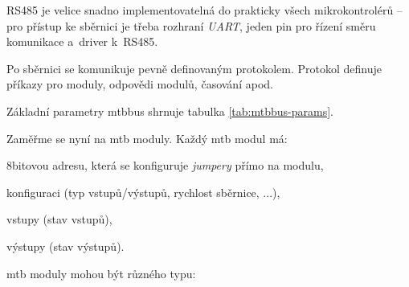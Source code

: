RS485 je velice snadno implementovatelná do prakticky všech mikrokontrolérů –
pro přístup ke sběrnici je třeba rozhraní \textit{UART}, jeden pin pro řízení směru
komunikace a~driver k~RS485.

Po sběrnici se komunikuje pevně definovaným protokolem. Protokol definuje
příkazy pro moduly, odpovědi modulů, časování apod. \cite{mtbbus-specs}

Základní parametry \gls{mtbbus} shrnuje tabulka \ref{tab:mtbbus-params}.

Zaměřme se nyní na \gls{mtb} moduly. Každý \gls{mtb} modul má:

\begin{compactenum}
\item 8bitovou adresu, která se konfiguruje \textit{jumpery} přímo na modulu,
\item konfiguraci (typ vstupů/výstupů, rychlost sběrnice, ...),
\item vstupy (stav vstupů),
\item výstupy (stav výstupů).
\end{compactenum}

\gls{mtb} moduly mohou být různého typu:

